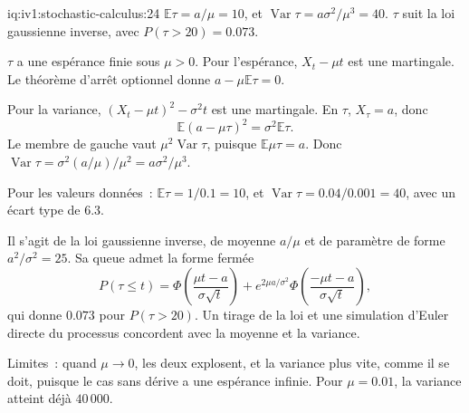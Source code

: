\begin{solution}{iq:iv1:stochastic-calculus:24}
$\mathbb{E}\tau = a/\mu = 10$, et $\operatorname{Var}\tau = a\sigma^2/\mu^3 = 40$. $\tau$ suit la loi gaussienne inverse, avec $P(\tau > 20) = 0.073$.

$\tau$ a une espérance finie sous $\mu > 0$. Pour l'espérance, $X_t - \mu t$ est une martingale. Le théorème d'arrêt optionnel donne $a - \mu\mathbb{E}\tau = 0$.

Pour la variance, $(X_t - \mu t)^2 - \sigma^2t$ est une martingale. En $\tau$, $X_\tau = a$, donc
\[
\mathbb{E}(a - \mu\tau)^2 = \sigma^2\mathbb{E}\tau.
\]
Le membre de gauche vaut $\mu^2\operatorname{Var}\tau$, puisque $\mathbb{E}\mu\tau = a$. Donc $\operatorname{Var}\tau = \sigma^2(a/\mu)/\mu^2 = a\sigma^2/\mu^3$.

Pour les valeurs données~: $\mathbb{E}\tau = 1/0.1 = 10$, et $\operatorname{Var}\tau = 0.04/0.001 = 40$, avec un écart type de $6.3$.

Il s'agit de la loi gaussienne inverse, de moyenne $a/\mu$ et de paramètre de forme $a^2/\sigma^2 = 25$. Sa queue admet la forme fermée
\[
P(\tau \le t) = \Phi\left(\frac{\mu t - a}{\sigma\sqrt{t}}\right) + e^{2\mu a/\sigma^2}\Phi\left(\frac{-\mu t - a}{\sigma\sqrt{t}}\right),
\]
qui donne $0.073$ pour $P(\tau > 20)$. Un tirage de la loi et une simulation d'Euler directe du processus concordent avec la moyenne et la variance.

Limites~: quand $\mu \to 0$, les deux explosent, et la variance plus vite, comme il se doit, puisque le cas sans dérive a une espérance infinie. Pour $\mu = 0.01$, la variance atteint déjà $40\,000$.



\end{solution}


